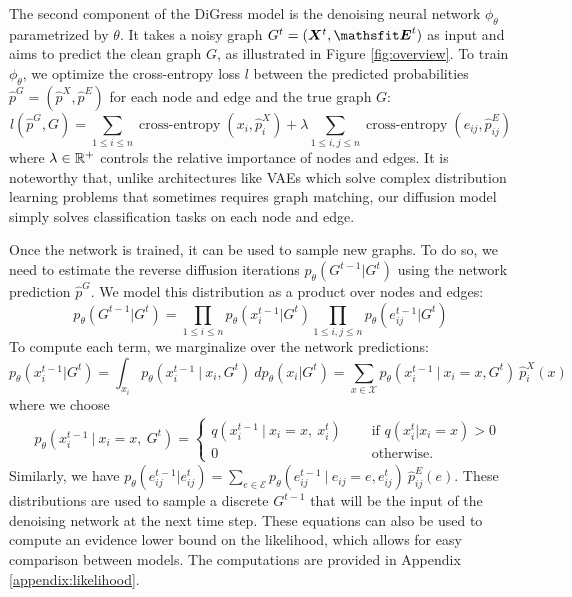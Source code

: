 \documentclass{article} %
\theoremstyle{plain}
\theoremstyle{definition}
\theoremstyle{remark}
\begin{document}
The second component of the DiGress model is the denoising neural network $\phi_\theta$ parametrized by $\theta$. It takes a noisy graph $G^t=(\mX^t, \tE^t)$ as input and aims to predict the clean graph $G$, as illustrated in Figure \ref{fig:overview}. 
To train $\phi_\theta$, we optimize the cross-entropy loss $l$ between the predicted probabilities $\hat p^G = (\hat p^X, \hat p^E)$ for each node and edge and the true graph $G$:
\begin{equation}
l(\hat p^G, G) = \sum_{1 \leq i \leq n} \operatorname{cross-entropy}(x_i, \hat p^X_i) + \lambda \sum_{1 \leq i, j \leq n} \operatorname{cross-entropy}(e_{ij}, \hat p^E_{ij}) \label{eq:loss}
\end{equation}
where $\lambda \in \mathbb{R}^+$ controls the relative importance of nodes and edges. It is noteworthy that, unlike architectures like VAEs which solve complex distribution learning problems that sometimes requires graph matching, our diffusion model simply solves classification tasks on each node and edge.

Once the network is trained, it can be used to sample new graphs. To do so, we need to estimate the reverse diffusion iterations $p_\theta(G^{t-1} | G^t)$ using the network prediction $\hat p^G$. We model this distribution as a product over nodes and edges: 
\begin{equation}
p_\theta(G^{t-1} | G^t) = \prod_{1 \leq i \leq n} p_\theta(x_i^{t-1} | G^t) \prod_{1\leq i, j \leq n} p_\theta(e_{ij}^{t-1} | G^t)
\end{equation}
To compute each term, we marginalize over the network predictions:
\[
    p_\theta(x_i^{t-1} | G^t) = \int_{x_i}  p_\theta(x_i^{t-1}~|~ x_i, G^t) ~ dp_\theta(x_i|G^t) = \sum_{x \in \mathcal X}  p_\theta(x_i^{t-1}~|~ x_i=x, G^t) ~ \hat p^X_i(x)
\]
where we choose
\begin{align}
\quad p_\theta(x_i^{t-1}~|~ x_i=x,~ G^t) = 
\begin{cases}
q(x_i^{t-1}~|~ x_i=x,~ x_i^t) \quad &\text{ if } q(x_i^t | x_i=x) > 0 \\
0 &\text{ otherwise.}
\end{cases}
\end{align}
Similarly, we have $p_\theta(e_{ij}^{t-1} | e_{ij}^t) = \sum_{e \in \mathcal E}  p_\theta(e_{ij}^{t-1}~|~ e_{ij}=e,  e_{ij}^t) ~ \hat p_{ij}^E(e)$. These distributions are used to sample a discrete $G^{t-1}$ that will be the input of the denoising network at the next time step.
These equations can also be used to compute an evidence lower bound on the likelihood, which allows for easy comparison between models. The computations are provided in Appendix \ref{appendix:likelihood}.
\end{document}
